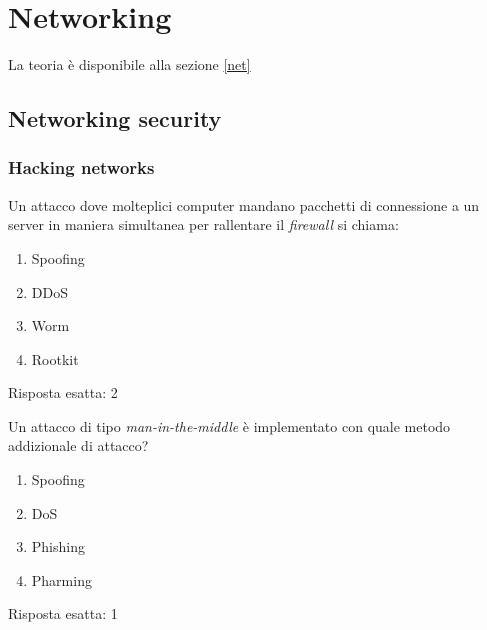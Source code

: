 \chapter{Networking}
\label{EsNet}

La teoria è disponibile alla sezione \ref{net}

\section{Networking security}

\subsection{Hacking networks}

\label{EsHacknet}

\begin{Exercise} [
  title={Quiz},
  label={net1}
  ]

  \Question Un attacco dove molteplici computer mandano pacchetti di
connessione a un server in maniera simultanea per rallentare il
\textit{firewall} si chiama:
\begin{enumerate}
 \item Spoofing
 \item DDoS
 \item Worm
 \item Rootkit
\end{enumerate}

\end{Exercise}


\begin{Answer} [
  ref={net1},
  number={1}
  ]

  \Question Risposta esatta: 2

\end{Answer}



\begin{Exercise} [
  title={Quiz},
  label={net2}
  ]

  \Question Un attacco di tipo \textit{man-in-the-middle} è implementato con
quale metodo addizionale di attacco?
\begin{enumerate}
 \item Spoofing
 \item DoS
 \item Phishing
 \item Pharming
\end{enumerate}

\end{Exercise}


\begin{Answer} [
  ref={net2},
  number={2}
  ]

  \Question Risposta esatta: 1

\end{Answer}
